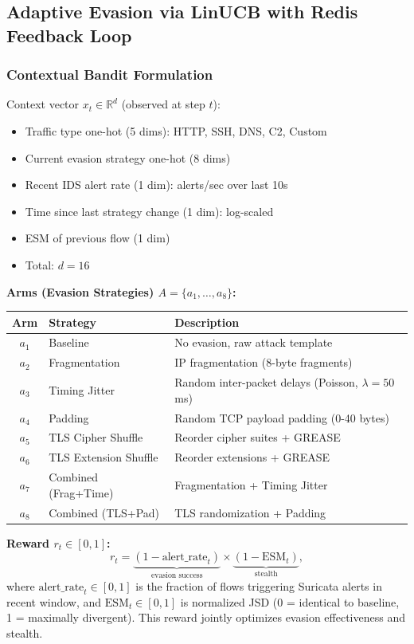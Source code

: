 \documentclass[review]{elsarticle}
\begin{document}
\subsection{Adaptive Evasion via LinUCB with Redis Feedback Loop}
\subsubsection{Contextual Bandit Formulation}
Context vector $x_t \in \mathbb{R}^d$ (observed at step $t$):
\begin{itemize}
\item Traffic type one-hot (5 dims): HTTP, SSH, DNS, C2, Custom
\item Current evasion strategy one-hot (8 dims)
\item Recent IDS alert rate (1 dim): alerts/sec over last 10s
\item Time since last strategy change (1 dim): log-scaled
\item ESM of previous flow (1 dim)
\item Total: $d = 16$
\end{itemize}

\textbf{Arms (Evasion Strategies) $A = \{a_1, \dots, a_8\}$:}
\begin{table}[htbp]
\small
\centering
\renewcommand{\arraystretch}{1.2}
\begin{tabular}{|c|l|l|}
\hline
\textbf{Arm} & \textbf{Strategy} & \textbf{Description} \\
\hline
$a_1$ & Baseline & No evasion, raw attack template \\
$a_2$ & Fragmentation & IP fragmentation (8-byte fragments) \\
$a_3$ & Timing Jitter & Random inter-packet delays (Poisson, $\lambda=50$ms) \\
$a_4$ & Padding & Random TCP payload padding (0-40 bytes) \\
$a_5$ & TLS Cipher Shuffle & Reorder cipher suites + GREASE \\
$a_6$ & TLS Extension Shuffle & Reorder extensions + GREASE \\
$a_7$ & Combined (Frag+Time) & Fragmentation + Timing Jitter \\
$a_8$ & Combined (TLS+Pad) & TLS randomization + Padding \\
\hline
\end{tabular}
\end{table}

\textbf{Reward $r_t \in [0, 1]$:}
\[
r_t = \underbrace{(1 - \text{alert\_rate}_t)}_{\text{evasion success}} \times \underbrace{(1 - \text{ESM}_t)}_{\text{stealth}},
\]
where $\text{alert\_rate}_t \in [0,1]$ is the fraction of flows triggering Suricata alerts in recent window, and $\text{ESM}_t \in [0,1]$ is normalized JSD (0 = identical to baseline, 1 = maximally divergent). This reward jointly optimizes evasion effectiveness and stealth.
\end{document}
